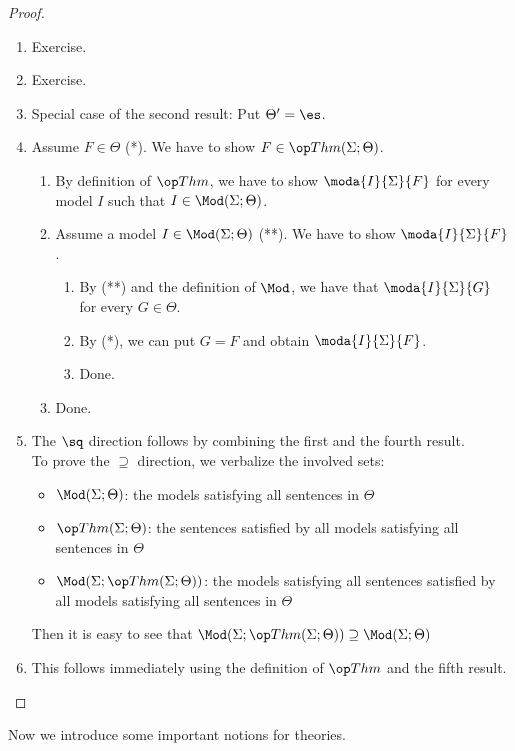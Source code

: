 \begin{proof}
\begin{enumerate}
\item Exercise.
\item Exercise.
\item Special case of the second result: Put $\Theta'=\es$.
\item Assume $F\in\Theta$ (*). We have to show $F\in\Thm(\Sigma;\Theta)$.
  \begin{enumerate}
     \item By definition of $\Thm$, we have to show $\moda{I}{\Sigma}{F}$ for every model $I$ such that $I\in\Mod(\Sigma;\Theta)$.
     \item Assume a model $I\in\Mod(\Sigma;\Theta)$ (**). We have to show $\moda{I}{\Sigma}{F}$.
     \begin{enumerate}
       \item By (**) and the definition of $\Mod$, we have that $\moda{I}{\Sigma}{G}$ for every $G\in\Theta$.
       \item By (*), we can put $G=F$ and obtain $\moda{I}{\Sigma}{F}$.
       \item Done.
     \end{enumerate}
     \item Done.
  \end{enumerate}
\item The $\sq$ direction follows by combining the first and the fourth result. \\
  To prove the $\supseteq$ direction, we verbalize the involved sets:
    \begin{itemize}
      \item $\Mod(\Sigma;\Theta)$: the models satisfying all sentences in $\Theta$
      \item $\Thm(\Sigma;\Theta)$: the sentences satisfied by all models satisfying all sentences in $\Theta$
      \item $\Mod(\Sigma;\Thm(\Sigma;\Theta))$: the models satisfying all sentences satisfied by all models satisfying all sentences in $\Theta$
     \end{itemize}
     Then it is easy to see that $\Mod(\Sigma;\Thm(\Sigma;\Theta))\supseteq\Mod(\Sigma;\Theta)$
\item This follows immediately using the definition of $\Thm$ and the fifth result. 
\end{enumerate}
\end{proof}
\medskip

Now we introduce some important notions for theories.

